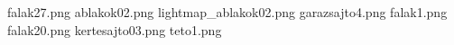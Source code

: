 falak27.png
ablakok02.png
lightmap_ablakok02.png
garazsajto4.png
falak1.png
falak20.png
kertesajto03.png
teto1.png
